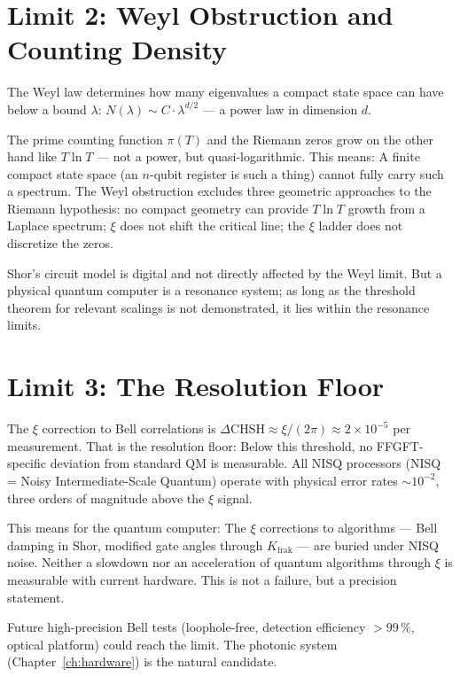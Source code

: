 \section{Limit 2: Weyl Obstruction and Counting Density}

The Weyl law determines how many eigenvalues a compact state space
can have below a bound $\lambda$:
$N(\lambda)\sim C\cdot\lambda^{d/2}$
--- a power law in dimension $d$.

The prime counting function $\pi(T)$ and the Riemann zeros grow
on the other hand like $T\ln T$ --- not a power, but quasi-logarithmic. This
means: A finite compact state space (an $n$-qubit register is
such a thing) cannot fully carry such a spectrum.
The Weyl obstruction excludes three geometric approaches to the
Riemann hypothesis: no compact geometry can
provide $T\ln T$ growth from a Laplace spectrum; $\xi$ does not shift
the critical line; the $\xi$ ladder does not discretize the
zeros.

Shor's circuit model is digital and not directly affected by the Weyl limit. But a physical quantum computer is a resonance system;
as long as the threshold theorem for relevant scalings is not demonstrated,
it lies within the resonance limits.

\section{Limit 3: The Resolution Floor}

The $\xi$ correction to Bell correlations is
$\Delta\mathrm{CHSH}\approx\xi/(2\pi)\approx2\times10^{-5}$ per
measurement. That is the resolution floor: Below this threshold, no FFGFT-specific
deviation from standard QM is measurable. All NISQ processors (NISQ =
Noisy Intermediate-Scale Quantum) operate with physical error rates
$\sim10^{-2}$, three orders of magnitude above the $\xi$ signal.

This means for the quantum computer: The $\xi$ corrections to algorithms
--- Bell damping in Shor, modified gate angles through $K_{\mathrm{frak}}$
--- are buried under NISQ noise. Neither a slowdown
nor an acceleration of quantum algorithms through $\xi$ is measurable with
current hardware. This is not a failure, but a precision statement.

Future high-precision Bell tests (loophole-free, detection
efficiency $>99\,\%$, optical platform) could reach the limit.
The photonic system (Chapter~\ref{ch:hardware}) is the natural
candidate.

